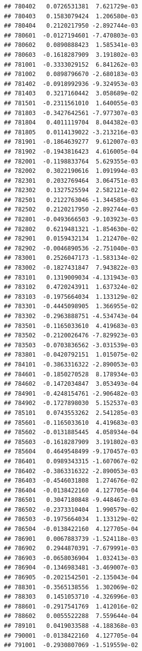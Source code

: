 \documentclass[ignorenonframetext,]{beamer}
\begin{document}
\begin{frame}[fragile]
\begin{verbatim}
## 780402   0.0726531381  7.621729e-03
## 780403   0.1583079424  1.206580e-03
## 780404   0.2120217950 -2.892744e-03
## 780601  -0.0127194601 -7.470803e-03
## 780602   0.0890888423  1.585341e-03
## 780603  -0.1618287909  3.191802e-03
## 781001  -0.3333029152  6.841262e-03
## 781002   0.0898796670 -2.680183e-03
## 781402  -0.0918992936 -9.324953e-03
## 781403   0.3217160442  3.058689e-02
## 781501  -0.2311561010  1.640055e-03
## 781803  -0.3427642561 -7.977307e-03
## 781804   0.4011119704  8.044382e-03
## 781805   0.0114139022 -3.213216e-03
## 781901  -0.1864639277  9.612007e-03
## 781902  -0.1943816423  4.616005e-04
## 782001  -0.1198833764  5.629355e-03
## 782002   0.3022190616  1.091994e-03
## 782301   0.2032769464  3.064751e-03
## 782302   0.1327525594  2.582121e-02
## 782501   0.2122763046 -1.344585e-03
## 782502   0.2120217950 -2.892744e-03
## 782801  -0.0493666503 -9.103923e-03
## 782802   0.6219481321 -1.854630e-02
## 782901   0.0159432134  1.212470e-02
## 782902  -0.0046890536 -2.751040e-03
## 783001   0.2526047173 -1.583134e-02
## 783002  -0.1827431847  7.943822e-03
## 783101   0.1319009034 -4.131943e-03
## 783102   0.4720243911  1.637324e-02
## 783103  -0.1975664034  1.133129e-02
## 783301  -0.4445098905  1.366955e-02
## 783302  -0.2963888751 -4.534743e-04
## 783501  -0.1165033610  4.419683e-03
## 783502  -0.2120026476 -7.829923e-03
## 783503  -0.0703836562 -3.031539e-03
## 783801  -0.0420792151  1.015075e-02
## 784101  -0.3863316322 -2.890053e-03
## 784601  -0.1850270528  8.178934e-03
## 784602  -0.1472034847  3.053493e-04
## 784901  -0.4248154761 -2.906482e-03
## 784902  -0.1727898030  5.152537e-03
## 785101   0.0743553262  2.541285e-03
## 785601  -0.1165033610  4.419683e-03
## 785602  -0.0131885445  4.058934e-04
## 785603  -0.1618287909  3.191802e-03
## 785604   0.4649548499 -9.170457e-03
## 786401   0.0989343315 -1.607067e-02
## 786402  -0.3863316322 -2.890053e-03
## 786403  -0.4546031808  1.274676e-02
## 786404  -0.0138422160  4.127705e-04
## 786501   0.3047180848 -9.448467e-03
## 786502  -0.2373310404  1.990579e-02
## 786503  -0.1975664034  1.133129e-02
## 786504  -0.0138422160  4.127705e-04
## 786901   0.0067883739 -1.524118e-03
## 786902   0.2944870391 -7.679991e-03
## 786903  -0.0658036904  1.032413e-03
## 786904  -0.1346983481 -3.469007e-03
## 786905  -0.2021542501 -2.135043e-04
## 788301  -0.3565138556  1.302069e-02
## 788303   0.1451053710 -4.326996e-03
## 788601  -0.2917541769  1.412016e-02
## 788602   0.0055522288  7.559644e-04
## 789101   0.0419033588 -4.188368e-03
## 790001  -0.0138422160  4.127705e-04
## 791001  -0.2930807069 -1.519559e-02

\end{verbatim}
\end{frame}
\end{document}
